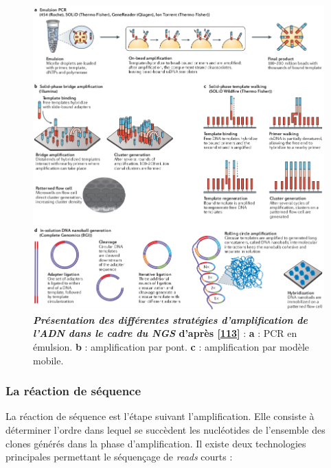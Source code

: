 \documentclass[12pt,a4paper,twoside]{ugathesis}
\theoremstyle{definition}
\theoremstyle{definition}
\theoremstyle{definition}
\theoremstyle{remark}
\begin{document}
\begin{figure}

{\centering \includegraphics[scale=.5]{figure/ngs_amplification} 

}

\caption[Présentation des différentes stratégies d'amplification de l'ADN dans le cadre du NGS]{\textbf{\emph{Présentation des différentes stratégies
d'amplification de l'ADN dans le cadre du NGS} d'après
{[}\protect\hyperlink{ref-Goodwin2016}{113}{]}} : \textbf{a} : PCR en
émulsion. \textbf{b} : amplification par pont. \textbf{c} :
amplification par modèle mobile.}\label{fig:pictngsampli}
\end{figure}







\newpage

\subsubsection{La réaction de séquence}\label{la-reaction-de-sequence}

La réaction de séquence est l'étape suivant l'amplification. Elle
consiste à déterminer l'ordre dans lequel se succèdent les nucléotides
de l'ensemble des clones générés dans la phase d'amplification. Il
existe deux technologies principales permettant le séquençage de
\emph{reads} courts :
\end{document}
